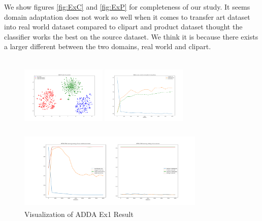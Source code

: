 \documentclass[conference]{IEEEtran}
\begin{document}
We show figures \ref{fig:ExC} and \ref{fig:ExP} for completeness of our study. It seems domain adaptation does not work so well when it comes to transfer art dataset into real world dataset compared to clipart and product dataset thought the classifier works the best on the source dataset. We think it is because there exists a larger different between the two domains, real world and clipart.
\begin{figure}[htb]

\centering
\begin{minipage}[t]{0.26\textwidth}
\includegraphics[width=1.6in, height=1.5in]{Ladda/A2R_no_preassign_no_dec_no_bn/ADDA_visual.png}
\end{minipage}%
\begin{minipage}[t]{0.26\textwidth}
\includegraphics[width=1.6in, height=1.5in]{Ladda/A2R_no_preassign_no_dec_no_bn/clf.png}
\end{minipage}%
\begin{minipage}[t]{0.45\textwidth}
\includegraphics[width=3.5in, height=1.5in]{Ladda/A2R_no_preassign_no_dec_no_bn/gan.png}
\end{minipage}%
\caption{Visualization of ADDA Ex1 Result}\label{fig:Ex1}
\end{figure}
\end{document}
